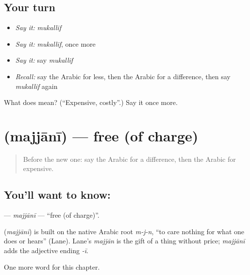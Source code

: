 \subsection*{Your turn}
\begin{itemize}
\raggedright
  \item \emph{Say it:} \emph{mukallif}
  \item \emph{Say it:} \emph{mukallif}, once more
  \item \emph{Say it:} say \emph{mukallif}
  \item \emph{Recall:} say the Arabic for less, then the Arabic for a difference, then say \emph{mukallif} again
\end{itemize}

\begin{tcolorbox}[breakable,colback=teal!4,colframe=teal!35!black,title={Before you move on}]
What does  mean? (\textquotedblleft{}Expensive, costly\textquotedblright{}.) Say it once more.
\end{tcolorbox}
\section[\texorpdfstring{\ar{مجاني} (majjānī)}{مجاني (majjānī)}]{ (majjānī) — free (of charge)}

\label{lesson:AR-C177-majjani}



\begin{quote}
Before the new one: say the Arabic for a difference, then the Arabic for expensive.
\end{quote}

\subsection*{You'll want to know: }
\textbf{} — \emph{majjānī} — \textquotedblleft{}free (of charge)\textquotedblright{}.

\begin{cousinweb}
\textbf{} (\emph{majjānī}) is built on the native Arabic root \emph{m-j-n}, \textquotedblleft{}to care nothing for what one does or hears\textquotedblright{} (Lane). Lane's \emph{majjān} is the gift of a thing without price; \emph{majjānī} adds the adjective ending \emph{-ī}.
\end{cousinweb}

\begin{grammarlens}[title={What you've built}]
One more word for this chapter.
\end{grammarlens}

